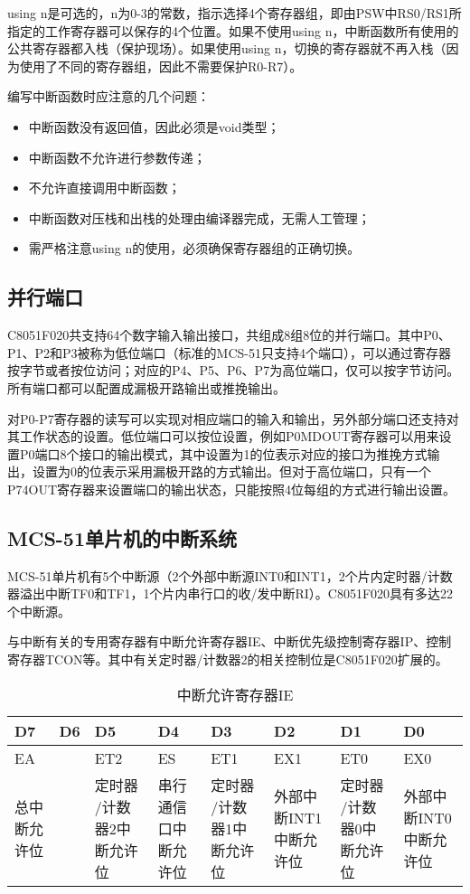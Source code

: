 \begin{spacing}{1.3}
using n是可选的，n为0-3的常数，指示选择4个寄存器组，即由PSW中RS0/RS1所指定的工作寄存器可以保存的4个位置。如果不使用using n，中断函数所有使用的公共寄存器都入栈（保护现场）。如果使用using n，切换的寄存器就不再入栈（因为使用了不同的寄存器组，因此不需要保护R0-R7）。

编写中断函数时应注意的几个问题：

\begin{itemize}
\item 中断函数没有返回值，因此必须是void类型；
\item 中断函数不允许进行参数传递；
\item 不允许直接调用中断函数；
\item 中断函数对压栈和出栈的处理由编译器完成，无需人工管理；
\item 需严格注意using n的使用，必须确保寄存器组的正确切换。
\end{itemize}

\subsection{并行端口}

C8051F020共支持64个数字输入输出接口，共组成8组8位的并行端口。其中P0、P1、P2和P3被称为低位端口（标准的MCS-51只支持4个端口），可以通过寄存器按字节或者按位访问；对应的P4、P5、P6、P7为高位端口，仅可以按字节访问。所有端口都可以配置成漏极开路输出或推挽输出。

对P0-P7寄存器的读写可以实现对相应端口的输入和输出，另外部分端口还支持对其工作状态的设置。低位端口可以按位设置，例如P0MDOUT寄存器可以用来设置P0端口8个接口的输出模式，其中设置为1的位表示对应的接口为推挽方式输出，设置为0的位表示采用漏极开路的方式输出。但对于高位端口，只有一个P74OUT寄存器来设置端口的输出状态，只能按照4位每组的方式进行输出设置。

\subsection{MCS-51单片机的中断系统}

MCS-51单片机有5个中断源（2个外部中断源INT0和INT1，2个片内定时器/计数器溢出中断TF0和TF1，1个片内串行口的收/发中断RI）。C8051F020具有多达22个中断源。

与中断有关的专用寄存器有中断允许寄存器IE、中断优先级控制寄存器IP、控制寄存器TCON等。其中有关定时器/计数器2的相关控制位是C8051F020扩展的。

\begin{table}[H]
\centering
\begin{tabular}{|p{1.5cm}<{\centering}|p{1.5cm}<{\centering}|p{1.8cm}<{\centering}|p{1.5cm}<{\centering}|p{1.8cm}<{\centering}|p{1.5cm}<{\centering}|p{1.8cm}<{\centering}|p{1.5cm}<{\centering}|}
\toprule
D7 & D6 & D5 & D4 & D3 & D2 & D1 & D0 \\
\midrule
EA & & ET2 & ES & ET1 & EX1 & ET0 & EX0 \\
\midrule
总中断允许位 & & 定时器 /计数器2中断允许位 & 串行通信口中断允许位 & 定时器 /计数器1中断允许位 & 外部中断INT1中断允许位 & 定时器 /计数器0中断允许位 & 外部中断INT0中断允许位 \\
\bottomrule
\end{tabular}
\caption{中断允许寄存器IE}
\end{table}


\end{spacing}
